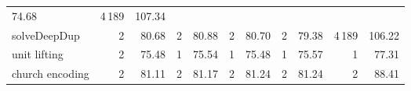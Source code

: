 \begin{tabular}{lrrrrrrrrrr}
 {\def\@currentlabel{74.68}\label{stats:slow:RateDup:SharedEvaled:time}74.68}&
 {\def\@currentlabel{4\,189}\label{stats:slow:RateDup:SharedFull:mem}4\,189} &
 {\def\@currentlabel{107.34}\label{stats:slow:RateDup:SharedFull:time}107.34} \\
\textsf{solveDeepDup}%
&
 {\def\@currentlabel{2}\label{stats:slow:SolveDeepDup:Unshared:mem}2} &
 {\def\@currentlabel{80.68}\label{stats:slow:SolveDeepDup:Unshared:time}80.68}&
 {\def\@currentlabel{2}\label{stats:slow:SolveDeepDup:Shared:mem}2} &
 {\def\@currentlabel{80.88}\label{stats:slow:SolveDeepDup:Shared:time}80.88}&
 {\def\@currentlabel{2}\label{stats:slow:SolveDeepDup:SharedThunk:mem}2} &
 {\def\@currentlabel{80.70}\label{stats:slow:SolveDeepDup:SharedThunk:time}80.70}&
 {\def\@currentlabel{2}\label{stats:slow:SolveDeepDup:SharedEvaled:mem}2} &
 {\def\@currentlabel{79.38}\label{stats:slow:SolveDeepDup:SharedEvaled:time}79.38}&
 {\def\@currentlabel{4\,189}\label{stats:slow:SolveDeepDup:SharedFull:mem}4\,189} &
 {\def\@currentlabel{106.22}\label{stats:slow:SolveDeepDup:SharedFull:time}106.22} \\
unit lifting%
&
 {\def\@currentlabel{2}\label{stats:slow:Unit:Unshared:mem}2} &
 {\def\@currentlabel{75.48}\label{stats:slow:Unit:Unshared:time}75.48}&
 {\def\@currentlabel{1}\label{stats:slow:Unit:Shared:mem}1} &
 {\def\@currentlabel{75.54}\label{stats:slow:Unit:Shared:time}75.54}&
 {\def\@currentlabel{1}\label{stats:slow:Unit:SharedThunk:mem}1} &
 {\def\@currentlabel{75.48}\label{stats:slow:Unit:SharedThunk:time}75.48}&
 {\def\@currentlabel{1}\label{stats:slow:Unit:SharedEvaled:mem}1} &
 {\def\@currentlabel{75.57}\label{stats:slow:Unit:SharedEvaled:time}75.57}&
 {\def\@currentlabel{1}\label{stats:slow:Unit:SharedFull:mem}1} &
 {\def\@currentlabel{77.31}\label{stats:slow:Unit:SharedFull:time}77.31} \\
church encoding%
&
 {\def\@currentlabel{2}\label{stats:slow:Church:Unshared:mem}2} &
 {\def\@currentlabel{81.11}\label{stats:slow:Church:Unshared:time}81.11}&
 {\def\@currentlabel{2}\label{stats:slow:Church:Shared:mem}2} &
 {\def\@currentlabel{81.17}\label{stats:slow:Church:Shared:time}81.17}&
 {\def\@currentlabel{2}\label{stats:slow:Church:SharedThunk:mem}2} &
 {\def\@currentlabel{81.24}\label{stats:slow:Church:SharedThunk:time}81.24}&
 {\def\@currentlabel{2}\label{stats:slow:Church:SharedEvaled:mem}2} &
 {\def\@currentlabel{81.24}\label{stats:slow:Church:SharedEvaled:time}81.24}&
 {\def\@currentlabel{2}\label{stats:slow:Church:SharedFull:mem}2} &
 {\def\@currentlabel{88.41}\label{stats:slow:Church:SharedFull:time}88.41} \\
\end{tabular}
\makeatother
